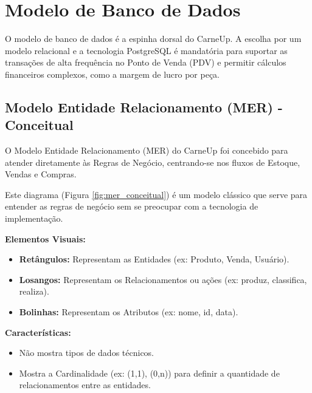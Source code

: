 \documentclass[
	12pt,				%
	openany,			%
	oneside,			%
	a4paper,			%
	english,			%
	french,				%
	spanish,			%
	brazil				%
	]{abntex2}
\begin{document}
\section{Modelo de Banco de Dados}
O modelo de banco de dados é a espinha dorsal do CarneUp. A escolha por um modelo relacional e a tecnologia PostgreSQL é mandatória para suportar as transações de alta frequência no Ponto de Venda (PDV) e permitir cálculos financeiros complexos, como a margem de lucro por peça.

\subsection{Modelo Entidade Relacionamento (MER) - Conceitual}
O Modelo Entidade Relacionamento (MER) do CarneUp foi concebido para atender diretamente às Regras de Negócio, centrando-se nos fluxos de Estoque, Vendas e Compras.

Este diagrama (Figura \ref{fig:mer_conceitual}) é um modelo clássico que serve para entender as regras de negócio sem se preocupar com a tecnologia de implementação.

\noindent\textbf{Elementos Visuais:}
\begin{itemize}
    \item \textbf{Retângulos:} Representam as Entidades (ex: Produto, Venda, Usuário).
    \item \textbf{Losangos:} Representam os Relacionamentos ou ações (ex: produz, classifica, realiza).
    \item \textbf{Bolinhas:} Representam os Atributos (ex: nome, id, data).
\end{itemize}

\noindent\textbf{Características:}
\begin{itemize}
    \item Não mostra tipos de dados técnicos.
    \item Mostra a Cardinalidade (ex: (1,1), (0,n)) para definir a quantidade de relacionamentos entre as entidades.
\end{itemize}
\end{document}
